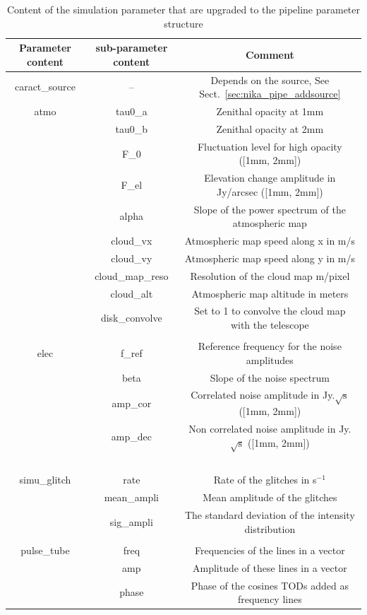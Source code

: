 \documentclass[a4paper]{article}
\begin{document}
\begin{table}[!h]
	\begin{center}
	\begin{tabular}{ccc}
	 \hline
         \hline
	Parameter content & sub-parameter content & Comment\\
	\hline
	caract\_source & -- & Depends on the source, See Sect.~\ref{sec:nika_pipe_addsource}\\
        atmo & tau0\_a & Zenithal opacity at 1mm \\
                 & tau0\_b & Zenithal opacity at 2mm \\
                 & F\_0 & Fluctuation level for high opacity ([1mm, 2mm])\\\
                 & F\_el & Elevation change amplitude in Jy/arcsec ([1mm, 2mm])\\
                 & alpha & Slope of the power spectrum of the atmospheric map\\
                 & cloud\_vx & Atmospheric map speed along x in m/s\\
                 & cloud\_vy & Atmospheric map speed along y in m/s\\
                 & cloud\_map\_reso & Resolution of the cloud map m/pixel\\
                 & cloud\_alt & Atmospheric map altitude in meters\\
                 & disk\_convolve & Set to 1 to convolve the cloud map with the telescope\\
                        & & \\
        elec & f\_ref & Reference frequency for the noise amplitudes\\
                & beta & Slope of the noise spectrum \\
                & amp\_cor & Correlated noise amplitude in Jy.$\sqrt{\mathrm{s}}$ ([1mm, 2mm])\\
                & amp\_dec & Non correlated noise amplitude in Jy.$\sqrt{\mathrm{s}}$ ([1mm, 2mm])\\\
                & & \\
        simu\_glitch & rate & Rate of the glitches in s$^{-1}$\\
                            & mean\_ampli & Mean amplitude of the glitches\\
                            & sig\_ampli & The standard deviation of the intensity distribution\\
                                            & & \\
        pulse\_tube & freq & Frequencies of the lines in a vector\\
                           & amp & Amplitude of these lines in a vector\\
                           & phase & Phase of the cosines TODs added as frequency lines\\
	\hline
	\end{tabular}
	\end{center}
	\caption{Content of the simulation parameter that are upgraded to the pipeline parameter structure}
	\label{tab:table_param_simu}
	\end{table}
\end{document}
